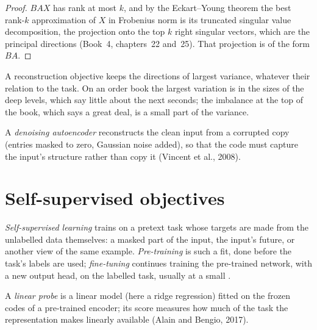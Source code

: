 \begin{proof}
$BAX$ has rank at most $k$, and by the Eckart--Young theorem the best rank-$k$ approximation of $X$ in Frobenius norm is
its truncated singular value decomposition, the projection onto the top $k$ right singular vectors, which are the
principal directions (Book~4, chapters~22 and~25). That projection is of the form $BA$.
\end{proof}

A reconstruction objective keeps the directions of largest variance, whatever their relation to the task. On an order
book the largest variation is in the sizes of the deep levels, which say little about the next seconds; the
imbalance at the top of the book, which says a great deal, is a small part of the variance.

\begin{definition}\label{def:ml:representation-learning:dae}
A \emph{denoising autoencoder} reconstructs the clean input from a corrupted copy (entries
masked to zero, Gaussian noise added), so that the code must capture the input's structure rather than copy it (Vincent
et al., 2008).
\end{definition}

\section{Self-supervised objectives}

\begin{definition}\label{def:ml:representation-learning:ssl}
\emph{Self-supervised learning} trains on a pretext task whose targets are made from the
unlabelled data themselves: a masked part of the input, the input's future, or another view of the same example.
\emph{Pre-training} is such a fit, done before the task's labels are used; \emph{fine-tuning}
continues training the pre-trained network, with a new output head, on the labelled task, usually at a small .
\end{definition}

\begin{definition}\label{def:ml:representation-learning:probe}
A \emph{linear probe} is a linear model (here a ridge regression) fitted on the frozen codes of a
pre-trained encoder; its score measures how much of the task the representation makes linearly available (Alain and
Bengio, 2017).
\end{definition}

